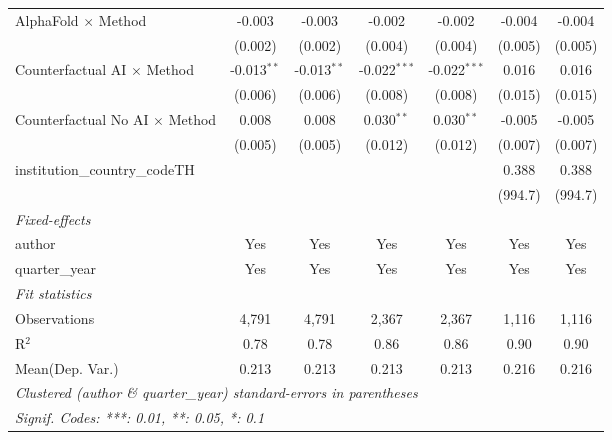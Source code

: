 \begin{tabular}{lcccccc}
   AlphaFold $\times$ Method             & -0.003         & -0.003         & -0.002         & -0.002         & -0.004        & -0.004\\   
                                         & (0.002)        & (0.002)        & (0.004)        & (0.004)        & (0.005)       & (0.005)\\   
   Counterfactual AI $\times$ Method     & -0.013$^{**}$  & -0.013$^{**}$  & -0.022$^{***}$ & -0.022$^{***}$ & 0.016         & 0.016\\   
                                         & (0.006)        & (0.006)        & (0.008)        & (0.008)        & (0.015)       & (0.015)\\   
   Counterfactual No AI $\times$ Method  & 0.008          & 0.008          & 0.030$^{**}$   & 0.030$^{**}$   & -0.005        & -0.005\\   
                                         & (0.005)        & (0.005)        & (0.012)        & (0.012)        & (0.007)       & (0.007)\\   
   institution\_country\_codeTH          &                &                &                &                & 0.388         & 0.388\\   
                                         &                &                &                &                & (994.7)       & (994.7)\\   
   \midrule
   \emph{Fixed-effects}\\
   author                                & Yes            & Yes            & Yes            & Yes            & Yes           & Yes\\  
   quarter\_year                         & Yes            & Yes            & Yes            & Yes            & Yes           & Yes\\  
   \midrule
   \emph{Fit statistics}\\
   Observations                          & 4,791          & 4,791          & 2,367          & 2,367          & 1,116         & 1,116\\  
   R$^2$                                 & 0.78           & 0.78           & 0.86           & 0.86           & 0.90          & 0.90\\  
Mean(Dep. Var.) & 0.213 & 0.213 & 0.213 & 0.213 & 0.216 & 0.216 \\
   \midrule \midrule
   \multicolumn{7}{l}{\emph{Clustered (author \& quarter\_year) standard-errors in parentheses}}\\
   \multicolumn{7}{l}{\emph{Signif. Codes: ***: 0.01, **: 0.05, *: 0.1}}\\
\end{tabular}
\par\endgroup
